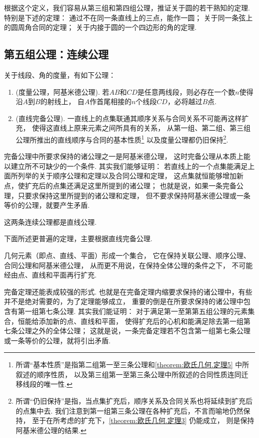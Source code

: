 根据这个定义，我们容易从第三组和第四组公理，推证关于圆的若干熟知的定理.
特别是下述的定理：
通过不在同一条直线上的三点，能作一圆；
关于同一条弦上的圆周角合同的定理；
关于内接于圆的一个四边形的角的定理.

\subsection{第五组公理：连续公理}

\begin{axiom}[连续公理]
关于线段、角的度量，有如下公理：
\begin{enumerate}
	\item (度量公理，阿基米德公理).
	若\(AB\)和\(CD\)是任意两线段，则必存在一个数\(n\)使得沿\(A\)到\(B\)的射线上，
	自\(A\)作首尾相接的\(n\)个线段\(CD\)，必将越过\(B\)点.
	\item (直线完备公理).
	一直线上的点集联通其顺序关系与合同关系不可能再这样扩充，
	使得这直线上原来元素之间所具有的关系，
	从第一组、第二组、第三组公理所推出的直线顺序与合同的基本性质\footnote{%
	所谓“基本性质”是指第二组第一至三条公理和\cref{theorem:欧氏几何.定理5} 中所叙述的顺序性质，
	以及第三组第一至第三条公理中所叙述的合同性质连同迁移线段的唯一性.}
	以及度量公理都仍旧保持\footnote{%
	所谓“仍旧保持”是指，当点集扩充后，顺序关系及合同关系也将延续到扩充后的点集中去.
	我们注意到第一组第三条公理在各种扩充后，不言而喻地仍然保持，
	至于在所考虑的扩充下，\cref{theorem:欧氏几何.定理3} 仍能成立，
	则是保持阿基米德公理的结果.}.
\end{enumerate}
\end{axiom}

完备公理中所要求保持的诸公理之一是阿基米德公理，
这时完备公理从本质上能以建立所不可缺少的一个条件.
其实我们能够证明：
若直线上的一个点集能满足上面所列举的关于顺序公理和定理以及合同公理和定理，
这点集就恒能够增加新点，使扩充后的点集还满足这里所提到的诸公理；
也就是说，如果一条完备公理，只要求保持这里所提到的诸公理和定理，
但不要求保持阿基米德公理或一条等价的公理，就要产生矛盾.

这两条连续公理都是直线公理.

下面所述更普遍的定理，主要根据直线完备公理.
\begin{theorem}[完备定理]\label{theorem:欧氏几何.定理32}
几何元素（即点、直线、平面）形成一个集合，
它在保持关联公理、顺序公理、合同公理和阿基米德公理，
从而更不用说，在保持全体公理的条件之下，
不可能经由点、直线和平面再行扩充.
\end{theorem}

完备定理还能表成较强的形式.
也就是在完备定理内缩要求保持的诸公理中，有些并不是绝对需要的，为了定理能够成立，
重要的倒是在所要求保持的诸公理中包含有第一组第七条公理.
其实我们能证明：
对于满足第一至第第五组公理的元素集合，恒能给添加新的点、直线和平面，
使得扩充后的心机和能满足除去第一组第七条公理之外的全体公理；
这就是说，一条完备定理若不包含第一组第七条公理或一条等价的公理，就将引出矛盾.

